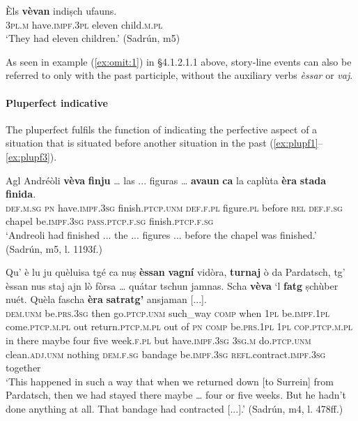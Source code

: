 \ea
\label {ex:prf:inch:4}
\gll Èls \textbf{vèvan} indiṣch ufauns.\\
\textsc{3pl.m} have.\textsc{impf.3pl} eleven child.\textsc{m.pl}\\
\glt `They had eleven children.' (Sadrún, m5)
\z

As seen in example (\ref{ex:omit:1}) in §4.1.2.1.1  above, story-line events can also be referred to only with the past participle, without the auxiliary verbs \textit{èssar} or \textit{vaj}.


\paragraph{Pluperfect indicative}
The pluperfect fulfils the function of indicating the perfective aspect of a situation that is situated before another situation in the past (\ref{ex:plupf1}--\ref{ex:plupf3}).

\ea
\label{ex:plupf1}
\gll  Agl Andréòli \textbf{vèva} \textbf{finju} … las ... figuras … \textbf{avaun} \textbf{ca} la caplùta \textbf{èra} \textbf{stada} \textbf{finida}. \\
\textsc{def.m.sg} \textsc{pn} have.\textsc{impf.3sg} finish.\textsc{ptcp.unm} {} \textsc{def.f.pl} {} figure.\textsc{pl} {} before \textsc{rel} \textsc{def.f.sg} chapel be.\textsc{impf.3sg} \textsc{pass.ptcp.f.sg} finish.\textsc{ptcp.f.sg} \\
\glt `Andreoli had finished ... the ... figures ... before the chapel was finished.' (Sadrún, m5, l. 1193f.)
\z

\ea
\label{ex:plupf2}
\gll  Qu' è lu ju quèluisa tgé ca nuṣ \textbf{èssan} \textbf{vagní} vidòra, \textbf{turnaj} ò da Pardatsch, tg' èssan nus staj ajn lò fòrsa … quátar tschun jamnas. Scha \textbf{vèva} `l \textbf{fatg} ṣchùber nuét. Quèla fascha \textbf{èra}  \textbf{satratg’} ansjaman [...]. \\
\textsc{dem.unm} be.\textsc{prs.3sg} then go.\textsc{ptcp.unm} such\_way \textsc{comp} when \textsc{1pl} be.\textsc{impf.1pl} come.\textsc{ptcp.m.pl} out return.\textsc{ptcp.m.pl} out of \textsc{pn} \textsc{comp} be.\textsc{prs.1pl} \textsc{1pl} \textsc{cop.ptcp.m.pl} in there maybe {} four five week.\textsc{f.pl} but have.\textsc{impf.3sg} \textsc{3sg.m} do.\textsc{ptcp.unm} clean.\textsc{adj.unm} nothing \textsc{dem.f.sg} bandage be.\textsc{impf.3sg} \textsc{refl.}contract.\textsc{impf.3sg} together \\
\glt `This happened in such a way that when we returned down [to Surrein] from Pardatsch, then we had stayed there maybe … four or five weeks. But he hadn’t done anything at all. That bandage had contracted [...].' (Sadrún, m4, l. 478ff.)
\z

